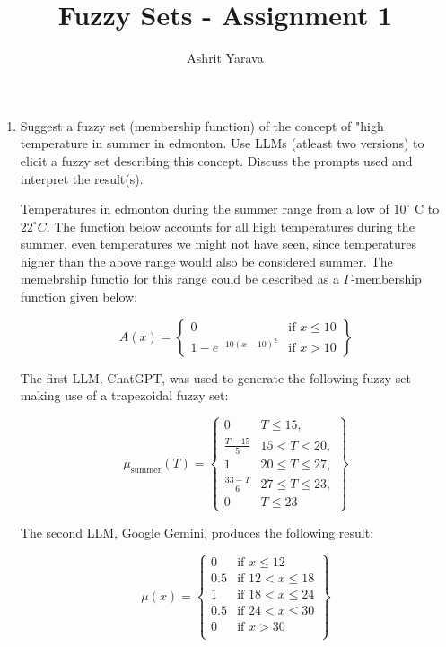 \documentclass{article}
\author{Ashrit Yarava}
\title{Fuzzy Sets - Assignment 1}
\begin{document}
\maketitle
	
\begin{enumerate}
	\item Suggest a fuzzy set (membership function) of the concept of "high temperature in summer in edmonton. Use LLMs (atleast two versions) to elicit a fuzzy set describing this concept. Discuss the prompts used and interpret the result(s).
	
	Temperatures in edmonton during the summer range from a low of $10^{\circ}$ C to $22^{\circ} C$. The function below accounts for all high temperatures during the summer, even temperatures we might not have seen, since temperatures higher than the above range would also be considered summer. The memebrship functio for this range could be described as a $\Gamma$-membership function given below:
	
	\[
		A(x) = \left \{\begin{matrix}
			0 & \text{if } x \leq 10\\
			1 - e^{-10(x - 10)^2} & \text{if } x > 10
		\end{matrix} \right \}
	\]
	
	The first LLM, ChatGPT, was used to generate the following fuzzy set making use of a trapezoidal fuzzy set:
	
	\[
		\mu_\text{summer} (T) = \left \{\begin{matrix}
			0 & T \leq 15, \\
			\frac{T - 15}{5} & 15 < T < 20, \\
			1 & 20 \leq T \leq 27, \\
			\frac{33 - T}{6} & 27 \leq T \leq 23, \\
			0 & T \leq 23
		\end{matrix} \right \}
	\]
	
	The second LLM, Google Gemini, produces the following result:
	
	\[
		\mu(x) = \left \{\begin{matrix}
			0 & \text{if } x \leq 12 \\
			0.5 & \text{if } 12 < x \leq 18 \\
			1 & \text{if } 18 < x \leq 24 \\
			0.5 & \text{if } 24 < x \leq 30 \\
			0 & \text{if } x > 30 \\
		\end{matrix}\right\}
	\]
	

\end{enumerate}
\end{document}
